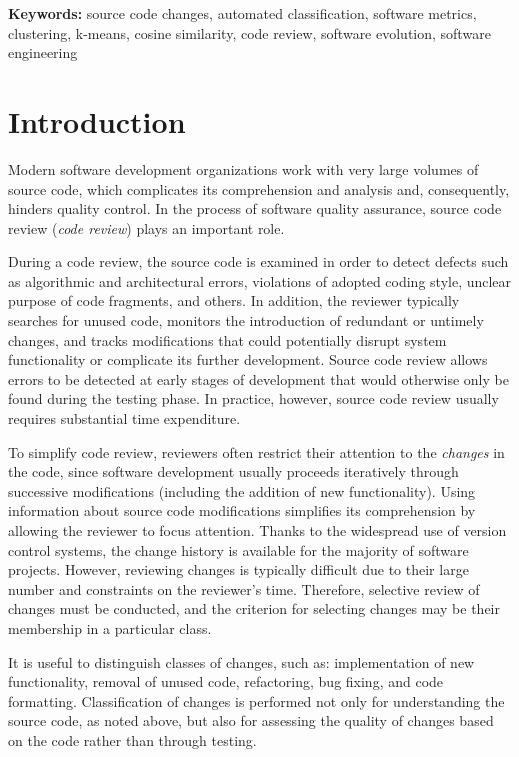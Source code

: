 \documentclass[11pt,a4paper]{article}
\begin{document}
\noindent\textbf{Keywords:} source code changes, automated classification, software metrics, clustering, k-means, cosine similarity, code review, software evolution, software engineering

\section{Introduction}
\label{sec:introduction}

Modern software development organizations work with very large volumes of source code, which complicates its comprehension and analysis and, consequently, hinders quality control. In the process of software quality assurance, source code review (\textit{code review}) plays an important role.

During a code review, the source code is examined in order to detect defects such as algorithmic and architectural errors, violations of adopted coding style, unclear purpose of code fragments, and others. In addition, the reviewer typically searches for unused code, monitors the introduction of redundant or untimely changes, and tracks modifications that could potentially disrupt system functionality or complicate its further development. Source code review allows errors to be detected at early stages of development that would otherwise only be found during the testing phase. In practice, however, source code review usually requires substantial time expenditure.

To simplify code review, reviewers often restrict their attention to the \emph{changes} in the code, since software development usually proceeds iteratively through successive modifications (including the addition of new functionality). Using information about source code modifications simplifies its comprehension by allowing the reviewer to focus attention. Thanks to the widespread use of version control systems, the change history is available for the majority of software projects. However, reviewing changes is typically difficult due to their large number and constraints on the reviewer's time. Therefore, selective review of changes must be conducted, and the criterion for selecting changes may be their membership in a particular class.

It is useful to distinguish classes of changes, such as: implementation of new functionality, removal of unused code, refactoring, bug fixing, and code formatting. Classification of changes is performed not only for understanding the source code, as noted above, but also for assessing the quality of changes based on the code rather than through testing.
\end{document}
